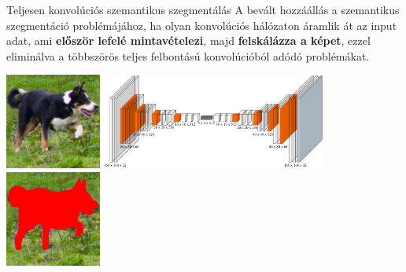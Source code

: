 \documentclass[english, aspectratio=169]{beamer}
\begin{document}
\begin{frame}{Teljesen konvolúciós szemantikus szegmentálás}
A bevált hozzáállás a szemantikus szegmentáció problémájához, ha olyan konvolúciós hálózaton áramlik át az input adat, ami \textbf{először lefelé mintavételezi}, majd \textbf{felskálázza a képet}, ezzel eliminálva a többszörös teljes felbontású konvolúcióból adódó problémákat. 
\vspace{.5cm}
\begin{center}
\includegraphics[height=3.15cm, keepaspectratio]{images/instance_13.png}
\includegraphics[height=3.15cm, keepaspectratio]{images/instance_12.png}
\includegraphics[height=3.15cm, keepaspectratio]{images/instance_14.png}
\end{center}
\end{frame}
\end{document}
